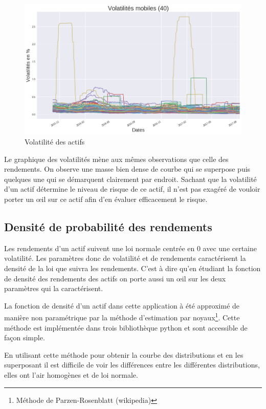\begin{figure}[H]
\centering
\caption{Volatilité des actifs}
   \includegraphics[scale=0.5]{img/volatilites.png}
\end{figure}

Le graphique des volatilités mène aux mêmes observations que celle des rendements. On observe une masse bien dense de courbe qui se superpose puis quelques une qui se démarquent clairement par endroit.
Sachant que la volatilité d'un actif détermine le niveau de risque de ce actif, il n'est pas exagéré de vouloir porter un œil sur ce actif afin d'en évaluer efficacement le risque.

\subsection{Densité de probabilité des rendements}

Les rendements d'un actif suivent une loi normale centrée en 0 avec une certaine volatilité.  Les paramètres donc de volatilité et de rendements caractérisent la densité de la loi que suivra les rendements. C'est à dire qu'en étudiant la fonction de densité des rendements des actifs on porte aussi un œil sur les deux paramètres qui la caractérisent.

La fonction de densité d'un actif dans cette application à été approximé de manière non paramétrique par la méthode d'estimation par noyaux\footnote{ Méthode de Parzen-Rosenblatt (wikipedia)}. Cette méthode est implémentée dans trois bibliothèque python et sont accessible de façon simple.

En utilisant cette méthode pour obtenir la courbe des distributions et en les superposant il est difficile de voir les différences entre les différentes distributions, elles ont l'air homogènes et de loi normale.

